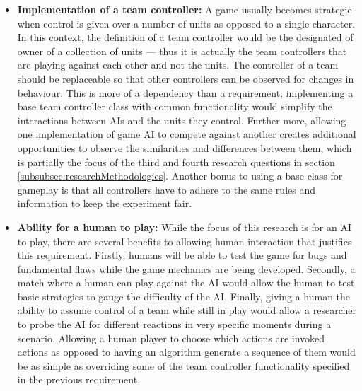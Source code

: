 \documentclass[11pt, a4paper]{article}
\begin{document}
\begin{itemize}
\item \textbf{Implementation of a team controller:}
A game usually becomes strategic when control is given over a number of units as opposed to a single character. In this context, the definition of a team controller would be the designated of owner of a collection of units --- thus it is actually the team controllers that are playing against each other and not the units. The controller of a team should be replaceable so that other controllers can be observed for changes in behaviour. This is more of a dependency than a requirement; implementing a base team controller class with common functionality would simplify the interactions between AIs and the units they control. Further more, allowing one implementation of game AI to compete against another creates additional opportunities to observe the similarities and differences between them, which is partially the focus of the third and fourth research questions in section \ref{subsubsec:researchMethodologies}. Another bonus to using a base class for gameplay is that all controllers have to adhere to the same rules and information to keep the experiment fair.

\item \textbf{Ability for a human to play:}
While the focus of this research is for an AI to play, there are several benefits to allowing human interaction that justifies this requirement. Firstly, humans will be able to test the game for bugs and fundamental flaws while the game mechanics are being developed. Secondly, a match where a human can play against the AI would allow the human to test basic strategies to gauge the difficulty of the AI. Finally, giving a human the ability to assume control of a team while still in play would allow a researcher to probe the AI for different reactions in very specific moments during a scenario. Allowing a human player to choose which actions are invoked actions as opposed to having an algorithm generate a sequence of them would be as simple as overriding some of the team controller functionality specified in the previous requirement.


\end{itemize}
\end{document}
